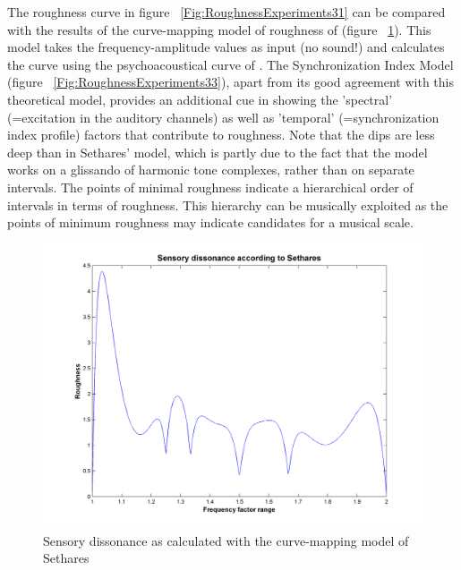 The roughness curve in figure ~\ref{Fig:RoughnessExperiments31}
can be compared with the results of the curve-mapping model of
roughness of (figure
~\ref{Fig:RoughnessExperiments30}). This model takes the
frequency-amplitude values as input (no sound!) and calculates the
curve using the psychoacoustical curve of . The
Synchronization Index Model (figure
~\ref{Fig:RoughnessExperiments33}), apart from its good agreement
with this theoretical model, provides an additional cue in showing
the 'spectral' (=excitation in the auditory channels) as well as
'temporal' (=synchronization index profile) factors that
contribute to roughness. Note that the dips are less deep than in
Sethares' model, which is partly due to the fact that the model
works on a glissando of harmonic tone complexes, rather than on
separate intervals. The points of minimal roughness indicate a
hierarchical order of intervals in terms of roughness. This
hierarchy can be musically exploited as the points of minimum
roughness may indicate candidates for a musical scale.

\begin{figure}
    \centering
    \includegraphics[width=\IPEMDefaultFigureWidth]{Graphics/RoughnessExperiments30}
    \caption{Sensory
    dissonance as calculated with the curve-mapping model of Sethares}
    \label{Fig:RoughnessExperiments30}
\end{figure}

